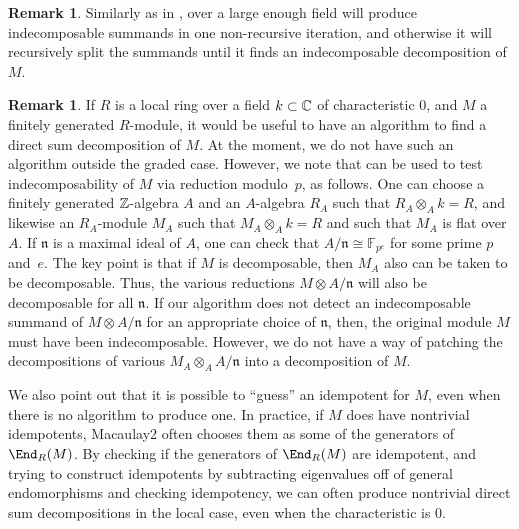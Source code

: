 \documentclass[12pt]{article}
\def\FF{\mathbb F}
\theoremstyle{theorem}
\numberwithin{thm}{section}
\theoremstyle{definition}
\newtheorem{rem}[thm]{Remark}
\def\n{\mathfrak n}
\begin{document}

\begin{rem}\label{rem:local}
  Similarly as in , over a large enough field  will produce indecomposable summands in one non-recursive iteration, and otherwise it will recursively split the summands until it finds an indecomposable decomposition of $M$.
\end{rem}

\begin{rem}\label{rem:char}
  If $R$ is a local ring over a field $k\subset \mathbb C$ of characteristic 0, and $M$ a finitely generated $R$-module, it would be useful to have an algorithm to find a direct sum decomposition of $M$.
  At the moment, we do not have such an algorithm outside the graded case.
  However, we note that  can be used to test indecomposability of $M$ via reduction modulo~$p$, as follows.
  One can choose a finitely generated $\mathbb Z$-algebra $A$ and an $A$-algebra $R_A$ such that $R_A\otimes _A k=R$, and likewise an $R_A$-module $M_A$ such that $M_A\otimes _A k = R$ and such that $M_A$ is flat over $A$. If $\n$ is a maximal ideal of $A$, one can check that $A/\n \cong \FF_{p^e}$ for some prime $p$ and~$e$.
  The key point is that if $M$ is decomposable, then $M_A$ also can be taken to be decomposable. Thus, the various reductions  $M\otimes A/\n$ will also be decomposable for all $\n$.
  If our algorithm does not detect an indecomposable summand of $M\otimes A/\n$ for an appropriate choice of $\n$, then, the original module $M$ must have been indecomposable.
  However,  we do not have a way of patching the decompositions of various $M_A\otimes_A A/\n$ into a decomposition of $M$.

  We also point out that it is possible to ``guess'' an idempotent for $M$, even when there is no algorithm to produce one. In practice, if $M$ does have nontrivial idempotents, Macaulay2 often chooses them as some of the generators of $\End_R(M)$. 
By checking if the generators of $\End_R(M)$ are idempotent, and trying to construct idempotents by subtracting eigenvalues off of general endomorphisms and checking idempotency, we can often produce nontrivial direct sum decompositions in the local case, even when the characteristic is 0.
\end{rem}



\end{document}
